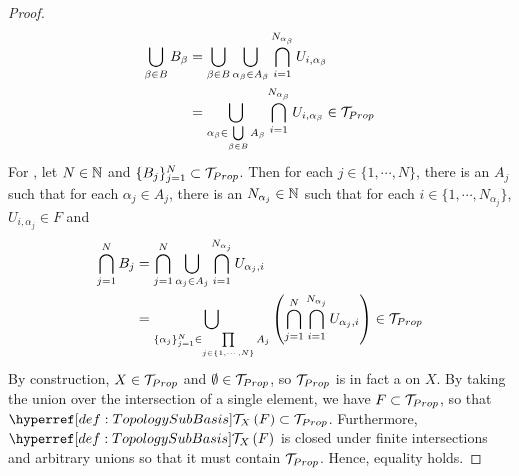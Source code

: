 \begin{prop}
\begin{proof}
        \begin{align*}
            \bigcup\limits_{\beta \in B} B_{\beta} & = \bigcup\limits_{\beta \in B} \bigcup\limits_{\alpha_\beta \in A_{\beta}} \bigcap\limits_{i=1}^{N_{\alpha_\beta}} U_{i, \alpha_\beta}\\
            & = \bigcup\limits_{\alpha_\beta \in \bigcup\limits_{\beta \in B} A_{\beta}} \bigcap\limits_{i =1 }^{N_{\alpha_\beta}} U_{i, \alpha_\beta} \in \mathcal{T}_{Prop}
        \end{align*}
        For \ClosureUnderFiniteIntersections, 
        let $N \in \mathbb{N}$ and 
        $\{B_j\}_{j=1}^N \subset \mathcal{T}_{Prop}$. 
        Then for each $j \in \{1, \cdots, N\}$, there 
        is an $A_{j}$
        such that for each $\alpha_{j} \in A_{j}$, 
        there is an $N_{\alpha_{j}} \in \mathbb{N}$ 
        such that for each $i \in \{1, \cdots, N_{\alpha_j}\}$, 
        $U_{i, \alpha_j} \in F$ and
        \begin{align*}
            \bigcap\limits_{j=1}^N B_j & = \bigcap\limits_{j=1}^N \bigcup\limits_{\alpha_j \in A_j} \bigcap\limits_{i=1}^{N_{\alpha_j}} U_{\alpha_j, i}\\
            & = \bigcup\limits_{\{\alpha_j\}_{j=1}^N \in \prod\limits_{j \in \{1, \cdots, N\}}A_{j}}\left( \bigcap\limits_{j=1}^{N} \bigcap_{i=1}^{N_{\alpha_j}} U_{\alpha_j, i}\right) \in \mathcal{T}_{Prop}
        \end{align*}
        By construction, $X \in \mathcal{T}_{Prop}$ and $\emptyset \in \mathcal{T}_{Prop}$, so 
        $\mathcal{T}_{Prop}$ is in fact a 
        \Topology on 
        $X$. 
        By taking the union over the intersection of a single element, we have $F \subset \mathcal{T}_{Prop}$, so that 
        $\scGeneratedTopology{X}{F} \subset \T_{Prop}$. 
        Furthermore, $\scGeneratedTopology{X}{F}$ is closed under finite intersections and arbitrary unions
        so that it must contain $\mathcal{T}_{Prop}$. 
        Hence, equality holds. 



    \end{proof}
\end{prop}
